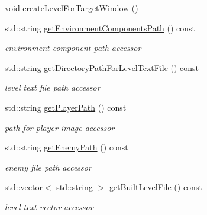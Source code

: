 \begin{DoxyCompactItemize}
void \hyperlink{class_pre_built_level_ac55f77e0ee464325cdd3ffa91292b0c8}{create\+Level\+For\+Target\+Window} ()
\item 
\hypertarget{class_pre_built_level_a9dad873a97adcdaf295fab180e121432}{}\label{class_pre_built_level_a9dad873a97adcdaf295fab180e121432} 
std\+::string \hyperlink{class_pre_built_level_a9dad873a97adcdaf295fab180e121432}{get\+Environment\+Components\+Path} () const
\begin{DoxyCompactList}\small\item\em environment component path accessor \end{DoxyCompactList}\item 
\hypertarget{class_pre_built_level_a71f044fcb4e420d230ec08fb99f052b7}{}\label{class_pre_built_level_a71f044fcb4e420d230ec08fb99f052b7} 
std\+::string \hyperlink{class_pre_built_level_a71f044fcb4e420d230ec08fb99f052b7}{get\+Directory\+Path\+For\+Level\+Text\+File} () const
\begin{DoxyCompactList}\small\item\em level text file path accessor \end{DoxyCompactList}\item 
\hypertarget{class_pre_built_level_a521829d7ce603cca33415de35cf848ea}{}\label{class_pre_built_level_a521829d7ce603cca33415de35cf848ea} 
std\+::string \hyperlink{class_pre_built_level_a521829d7ce603cca33415de35cf848ea}{get\+Player\+Path} () const
\begin{DoxyCompactList}\small\item\em path for player image accessor \end{DoxyCompactList}\item 
\hypertarget{class_pre_built_level_acbde88b4ef5e5c62612baa33d0940aa4}{}\label{class_pre_built_level_acbde88b4ef5e5c62612baa33d0940aa4} 
std\+::string \hyperlink{class_pre_built_level_acbde88b4ef5e5c62612baa33d0940aa4}{get\+Enemy\+Path} () const
\begin{DoxyCompactList}\small\item\em enemy file path accessor \end{DoxyCompactList}\item 
\hypertarget{class_pre_built_level_a5c7c3ad889ff5eab0cfb367945523d6b}{}\label{class_pre_built_level_a5c7c3ad889ff5eab0cfb367945523d6b} 
std\+::vector$<$ std\+::string $>$ \hyperlink{class_pre_built_level_a5c7c3ad889ff5eab0cfb367945523d6b}{get\+Built\+Level\+File} () const
\begin{DoxyCompactList}\small\item\em level text vector accessor \end{DoxyCompactList}\item 

\end{DoxyCompactItemize}
